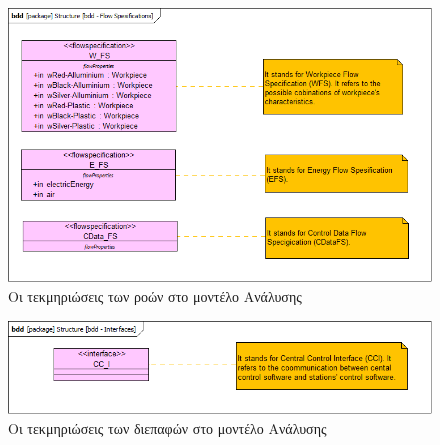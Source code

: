 \documentclass[a4paper,12pt,twoside]{report}
\begin{document}
\begin{appendices}
			\begin{figure}[hp]
					\centering
					\includegraphics[scale=0.30]{AnalysisModel_bdd-FlowSpesifications.png}
					\caption{Οι τεκμηριώσεις των ροών στο μοντέλο Ανάλυσης}
					\label{φωτ:Οι τεκμηριώσεις των ροών στο μοντέλο Ανάλυσης}
			\end{figure}
			
			\begin{figure}[hp]
					\centering
					\includegraphics[scale=0.30]{AnalysisModel_bdd-Interfaces.png}
					\caption{Οι τεκμηριώσεις των διεπαφών στο μοντέλο Ανάλυσης}
					\label{φωτ:Οι τεκμηριώσεις των διεπαφών στο μοντέλο Ανάλυσης}
			\end{figure}
			

\end{appendices}
\end{document}
